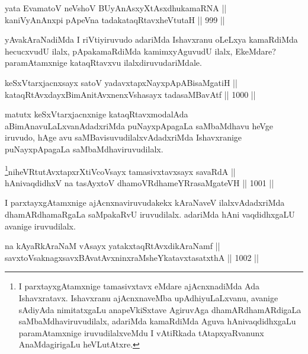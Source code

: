 \begin{shl}
yata EvamatoV neVshoV BUyAnAsxyXtAsxdhukamaRNA || \\
kaniVyAnAnxpi pApeVna tadakataqRtavxheVtutaH \hfill || 999 ||  
\end{shl}

\begin{artha}
yAvakAraNadiMda I riVtiyiruvudo adariMda Ishavxranu oLeLxya kamaRdiMda hecucxvudU ilalx, pApakamaRdiMda kamimxyAguvudU ilalx, EkeMdare? paramAtamxnige kataqRtavxvu ilalxdiruvudariMdale.
\end{artha}

\begin{shl}
keSxVtarxjacnxsayx satoV yadavxtapxNayxpApABisaMgatiH || \\
kataqRtAvxdayxBimAnitAvxnenxVshasayx tadasaMBavAtf \hfill || 1000 ||  
\end{shl}

\begin{artha}
matutx keSxVtarxjacnxnige kataqRtavxmodalAda aBimAnavuLaLxvanAdadxriMda puNayxpApagaLa saMbaMdhavu heVge iruvudo, hAge avu saMBavisuvudilalxvAdadxriMda Ishavxranige puNayxpApagaLa saMbaMdhaviruvudilalx.
\end{artha}

\begin{shl}
\footnote{I parxtayxgAtamxnige tamasivxtavx eMdare ajAcnxnadiMda Ada Ishavxratavx. Ishavxranu ajAcnxnaveMba upAdhiyuLaLxvanu, avanige sAdiyAda nimitatxgaLu anapeVkiSxtave AgiruvAga dhamARdhamARdigaLa saMbaMdhaviruvudilalx, adariMda kamaRdiMda Aguva hAnivaqdidhxgaLu paramAtamxnige iruvudilalxveMdu I vAtiRkada tAtapxyaRvanunx AnaMdagirigaLu heVLutAtxre.}niheVRtutAvxtapxrXtiVcoV\s sayx tamasivxtavxsayx savaRdA || \\
hAnivaqdidhxV na tasAyxtoV dhamoVRdhameYRrasaMgateVH \hfill || 1001 ||  
\end{shl}

\begin{artha}
 I parxtayxgAtamxnige ajAcnxnaviruvudakekx kAraNaveV ilalxvAdadxriMda dhamARdhamaRgaLa saMpakaRvU iruvudilalx. adariMda hAni vaqdidhxgaLU avanige iruvudilalx.
\end{artha}


\begin{shl}
na kAyaRkAraNaM vA\s sayx yatakxtaqRtAvxdikAraNamf || \\
savxtoV\s saknagxsavxBAvatAvxninxraMsheYkatavxtasatxthA \hfill || 1002 ||  
\end{shl}

